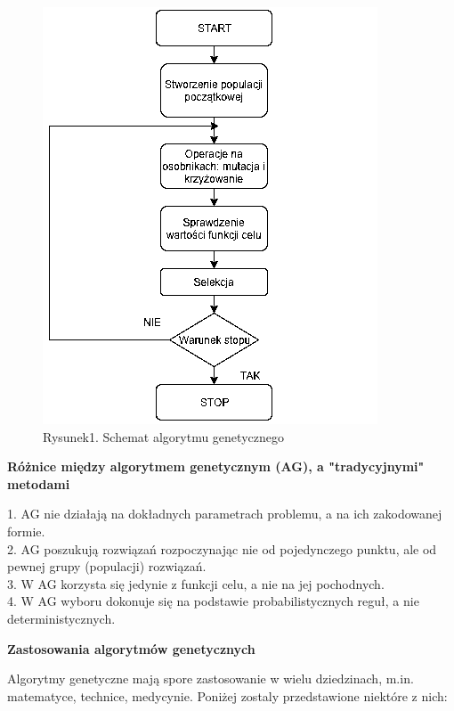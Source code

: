 \documentclass[a4paper, twoside, 12pt, justified]{article}
\begin{document}
	\begin{figure}[h]
		\includegraphics[scale=0.8]{ag}
		\centering
		\\
		{Rysunek1. Schemat algorytmu genetycznego} 
	\end{figure}	
	
	\newpage
	\begin{large}
		\begin{center}
			\textbf{Różnice między algorytmem genetycznym (AG), a "tradycyjnymi" metodami}
		\end{center}
	\end{large}

	
	\hspace{-6mm}1. AG nie działają na dokładnych parametrach problemu, a na ich zakodowanej formie.\\
	2. AG poszukują rozwiązań rozpoczynając nie od pojedynczego punktu, ale od pewnej grupy (populacji) rozwiązań.\\
	3. W AG korzysta się jedynie z funkcji celu, a nie na jej pochodnych.\\
	4. W AG wyboru dokonuje się na podstawie probabilistycznych reguł, a nie deterministycznych.\\
	
	
	
	
	
	\begin{large}
		\begin{center}
			\textbf{Zastosowania algorytmów genetycznych}
		\end{center}
	\end{large}
	Algorytmy genetyczne mają spore zastosowanie w wielu dziedzinach, m.in. matematyce, technice, medycynie. Poniżej zostaly przedstawione niektóre z nich:
	
\end{document}
